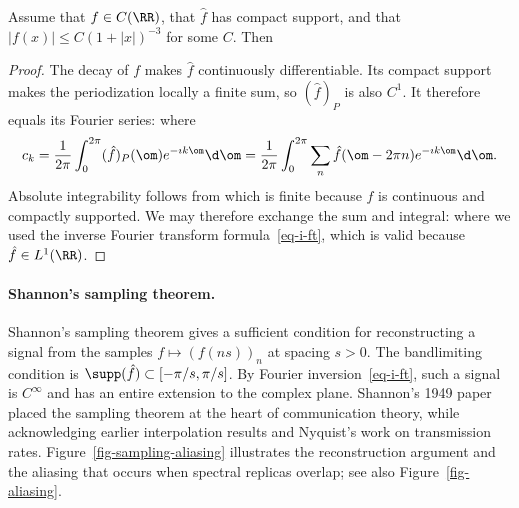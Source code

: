 \begin{prop}\label{prop-poisson}
Assume that $f\in C(\RR)$, that $\hat f$ has compact support, and that $|f(x)| \leq C(1+|x|)^{-3}$ for some $C$. Then
\end{prop}
\begin{proof}
	The decay of $f$ makes $\hat f$ continuously differentiable. Its compact support makes the periodization locally a finite sum, so $(\hat f)_P$ is also $C^1$. It therefore equals its Fourier series:
	where
	\begin{align*}
		c_k = \frac{1}{2\pi} \int_0^{2\pi} (\hat f)_P(\om) e^{-\imath k \om} \d \om = 
		\frac{1}{2\pi} \int_0^{2\pi} \sum_n \hat f(\om-2\pi n) e^{-\imath k \om}  \d \om .
	\end{align*}
	Absolute integrability follows from
	which is finite because $\hat f$ is continuous and compactly supported. We may therefore exchange the sum and integral:
	where we used the inverse Fourier transform formula~\eqref{eq-i-ft}, which is valid because $\hat f \in L^1(\RR)$.
\end{proof}

\paragraph{Shannon's sampling theorem.}

Shannon's sampling theorem gives a sufficient condition for reconstructing a signal from the samples $f \mapsto (f(ns))_n$ at spacing $s>0$.
%
The bandlimiting condition is $\supp(\hat f) \subset [-\pi/s,\pi/s]$. By Fourier inversion~\eqref{eq-i-ft}, such a signal is $C^\infty$ and has an entire extension to the complex plane.
%
Shannon's 1949 paper placed the sampling theorem at the heart of communication theory, while acknowledging earlier interpolation results and Nyquist's work on transmission rates.
%
Figure~\ref{fig-sampling-aliasing} illustrates the reconstruction argument and the aliasing that occurs when spectral replicas overlap; see also Figure~\ref{fig-aliasing}.

